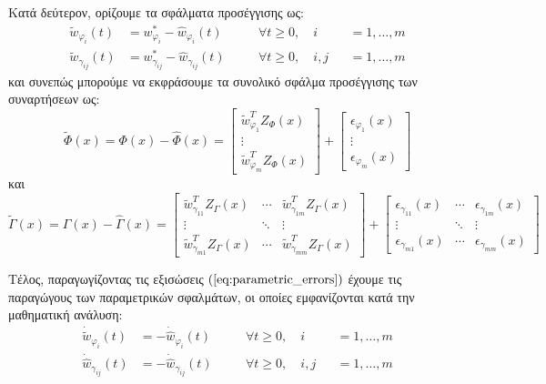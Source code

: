 Κατά δεύτερον, ορίζουμε τα σφάλματα προσέγγισης ως:
\begin{equation}
\begin{alignedat}{3}
	\tilde{w}_{\varphi_i}(t) &= w_{\varphi_i}^* - \hat{w}_{\varphi_i}(t) \quad &&\forall t \geq 0, \quad  i&&= 1,\dots,m \\
	\tilde{w}_{\gamma_{ij}}(t) &= w_{\gamma_{ij}}^* - \hat{w}_{\gamma_{ij}}(t)
	\quad &&\forall t \geq 0, \quad  i,j&&= 1,\dots,m 
	\end{alignedat}
	\label{eq:parametric_errors}
\end{equation}
και συνεπώς μπορούμε να εκφράσουμε τα συνολικό σφάλμα προσέγγισης των συναρτήσεων ως:
\begin{equation}
\tilde{\Phi}(x) = \Phi(x) - \hat{\Phi}(x) = 
	\begin{bmatrix}
	\tilde{w}_{\varphi_1}^T Z_{\Phi}(x) \\ \vdots \\ \tilde{w}_{\varphi_m}^T Z_{\Phi}(x)
	\end{bmatrix} + 
	\begin{bmatrix}
	\epsilon_{\varphi_1}(x) \\ \vdots \\ \epsilon_{\varphi_m}(x) 
	\end{bmatrix}
\end{equation}
και 
\begin{equation}
\tilde{\Gamma}(x) = \Gamma(x) - \hat{\Gamma}(x) = 
\begin{bmatrix} \tilde{w}_{\gamma_{11}}^T Z_{\Gamma}(x) & \cdots & \tilde{w}_{\gamma_{1m}}^T Z_{\Gamma}(x) \\
\vdots    & \ddots & \vdots         \\
\tilde{w}_{\gamma_{m1}}^T Z_{\Gamma}(x) & \cdots & \tilde{w}_{\gamma_{mm}}^T Z_{\Gamma}(x)
\end{bmatrix} +
\begin{bmatrix} \epsilon_{\gamma_{11}}(x) & \cdots & \epsilon_{\gamma_{1m}}(x) \\
\vdots    & \ddots & \vdots         \\
\epsilon_{\gamma_{m1}}(x) & \cdots & \epsilon_{\gamma_{mm}}(x)
\end{bmatrix}
\end{equation}

Τέλος, παραγωγίζοντας τις εξισώσεις $(\ref{eq:parametric_errors})$ έχουμε τις παραγώγους των παραμετρικών σφαλμάτων, οι οποίες εμφανίζονται κατά την μαθηματική ανάλυση:
\begin{equation}
\begin{alignedat}{3}
\dot{\tilde{w}}_{\varphi_i}(t) &=  - \dot{\hat{w}}_{\varphi_i}(t) \quad &&\forall t \geq 0, \quad  i&&= 1,\dots,m \\
\dot{\hat{w}}_{\gamma_{ij}}(t) &=  - \dot{\hat{w}}_{\gamma_{ij}}(t)
\quad &&\forall t \geq 0, \quad  i,j&&= 1,\dots,m 
\end{alignedat}
\label{eq:parametric_error_derivatives}
\end{equation}

